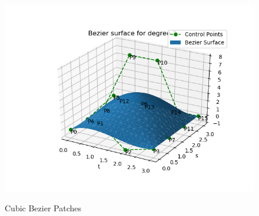 \documentclass[a4paper, 11pt]{article}
\begin{document}
\begin{enumerate}
\begin{enumerate}[label=\alph*.]
\begin{figure}[ht]
{    \includegraphics[scale=0.6]{resources/bezierSurface3.png} \label{fig:cubicBezierPatch} 
  } 
 \quad 
  \caption{Cubic Bezier Patches} 
  \label{fig:CubicPatch}
\end{figure}
\clearpage
\begin{figure}[ht] 

\end{figure}
\end{enumerate}
\end{enumerate}
\end{document}
